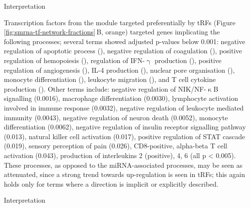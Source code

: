 Interpretation

Transcription factors from the module targeted preferentially by tRFs (Figure \ref{fig:smrna-tf-network-fractions}\,B, orange) targeted genes implicating the following processes; several terms showed adjusted p-values below 0.001: negative regulation of apoptotic process (), negative regulation of coagulation (), positive regulation of hemopoiesis (), regulation of IFN-$\upgamma$ production (), positive regulation of angiogenesis (), IL-4 production (), nuclear pore organisation (), monocyte differentiation (), leukocyte migration (), and T cell cytokine production (). Other terms include: negative regulation of NIK/NF-$\upkappa$B signalling (0.0016), macrophage differentiation (0.0030), lymphocyte activation involved in immune response (0.0032), negative regulation of leukocyte mediated immunity (0.0043), negative regulation of neuron death (0.0052), monocyte differentiation (0.0062), negative regulation of insulin receptor signalling pathway (0.013), natural killer cell activation (0.017), positive regulation of STAT cascade (0.019), sensory perception of pain (0.026), CD8-positive, alpha-beta T cell activation (0.043), production of interleukins 2 (positive), 4, 6 (all p < 0.005). These processes, as opposed to the miRNA-associated processes, may be seen as attenuated, since a strong trend towards up-regulation is seen in tRFs; this again holds only for terms where a direction is implicit or explicitly described.

Interpretation

\newpage
